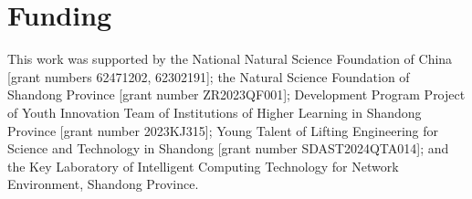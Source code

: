 \documentclass[preprint,12pt]{elsarticle}
\begin{document}
\section*{Funding}
This work was supported by the National Natural Science Foundation of China [grant numbers 62471202, 62302191]; the Natural Science Foundation of Shandong Province [grant number ZR2023QF001]; Development Program Project of Youth Innovation Team of Institutions of Higher Learning in Shandong Province [grant number 2023KJ315]; Young Talent of Lifting Engineering for Science and Technology in Shandong [grant number SDAST2024QTA014]; and the Key Laboratory of Intelligent Computing Technology for Network Environment, Shandong Province.


 


\end{document}
